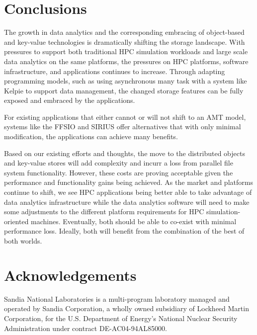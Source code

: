 \section{Conclusions}\label{sec:conclusion}

The growth in data analytics and the corresponding embracing of object-based
and key-value technologies is dramatically shifting the storage landscape. With
pressures to support both traditional HPC simulation workloads and large scale
data analytics on the same platforms, the pressures on HPC platforms, software
infrastructure, and applications continues to increase. Through adapting
programming models, such as using asynchronous many task with a system like
Kelpie to support data management, the changed storage features can be fully
exposed and embraced by the applications.

For existing applications that either cannot or will not shift to an AMT model,
systems like the FFSIO and SIRIUS offer alternatives that with only minimal
modification, the applications can achieve many benefits.

Based on our existing efforts and thoughts, the move to the distributed objects
and key-value stores will add complexity and incurr a loss from parallel file
system functionality. However, these costs are proving acceptable given the
performance and functionality gains being achieved. As the market and platforms
continue to shift, we see HPC applications being better able to take advantage
of data analytics infrastructure while the data analytics software will need to
make some adjustments to the different platform requirements for HPC
simulation-oriented machines. Eventually, both should be able to co-exist with
minimal performance loss. Ideally, both will benefit from the combination of
the best of both worlds.

\section*{Acknowledgements}
Sandia National Laboratories is a multi-program laboratory managed and operated
by Sandia Corporation, a wholly owned subsidiary of Lockheed Martin
Corporation, for the U.S. Department of Energy's National Nuclear Security
Administration under contract DE-AC04-94AL85000.



